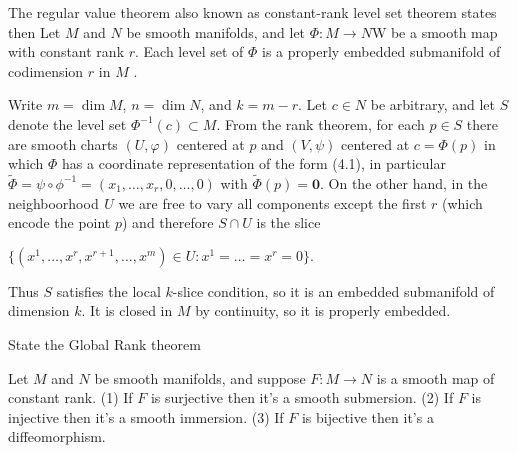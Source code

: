 The regular value theorem also known as constant-rank level set theorem states then
Let \( M \) and \( N \) be smooth manifolds, and let \( \Phi : M \to N \)W  be a smooth map with constant rank \( r \). 
Each level set of \( \Phi \) is a properly embedded submanifold of codimension \( r \) in \( M \) .

Write \(m = \dim M\), \(n = \dim N\), and \(k = m - r\). Let \(c \in N\) be arbitrary, and let \(S\) denote the level set \(\Phi^{-1}(c) \subset M\). From the rank theorem, for each \(p \in S\) there are smooth charts \((U, \varphi)\) centered at \(p\) and \((V, \psi)\) centered at \(c = \Phi(p)\) in which \(\Phi\) has a coordinate representation of the form (4.1), in particular \(\tilde{\Phi} = \psi \circ \phi^{-1} = (x_1, \dots, x_r, 0, \dots, 0) \) with \( \tilde{\Phi}(p) = \textbf{0} \). On the other hand, in the neighboorhood  \(U\) we are free to vary all components except the first \(r\) (which encode the point \(p\)) and therefore \(S \cap U\) is the slice   
 
\(\{(x^1, \dots, x^r, x^{r+1}, \dots, x^m) \in U : x^1 = \dots = x^r = 0\}.\)

Thus \(S\) satisfies the local \(k\)-slice condition, so it is an embedded submanifold of dimension \(k\). It is closed in \(M\) by continuity, so it is properly embedded.



State the Global Rank theorem

Let \( M \) and \( N \) be smooth manifolds, and suppose \( F : M \to N \) is a smooth map of constant rank. 
(1) If \( F \) is surjective then it's a smooth submersion. 
(2) If \( F \) is injective then it's a smooth immersion. 
(3) If \( F \) is bijective then it's a diffeomorphism.
